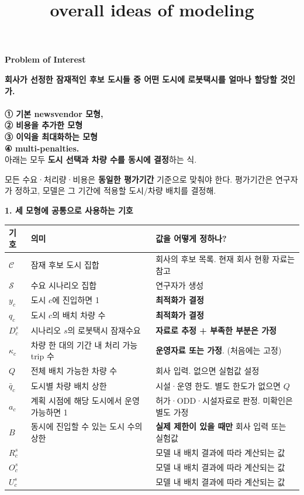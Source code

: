 \documentclass[11pt,a4paper]{article}
\title{overall ideas of modeling}
\newcommand{\blocktitle}[1]{\par\bigskip\noindent\textbf{\large #1}\par\smallskip}
\begin{document}
\blocktitle{Problem of Interest}
\textbf{회사가 선정한 잠재적인 후보 도시들 중 어떤 도시에 로봇택시를 얼마나 할당할 것인가.} \\
\\
\textbf{① 기본 newsvendor 모형, \\
② 비용을 추가한 모형 \\
③ 이익을 최대화하는 모형 \\
④ multi-penalties.} \\
아래는 모두 \textbf{도시 선택과 차량 수를 동시에 결정}하는 식.

모든 수요·처리량·비용은 \textbf{동일한 평가기간} 기준으로 맞춰야 한다. 평가기간은 연구자가 정하고, 모델은 그 기간에 적용할 도시/차량 배치를 결정해.

\blocktitle{1. 세 모형에 공통으로 사용하는 기호}

\begin{longtable}{@{}P{0.12\textwidth}P{0.34\textwidth}P{0.46\textwidth}@{}}
\toprule
기호 & 의미 & 값을 어떻게 정하나? \\
\midrule
\endhead
$\mathcal C$ & 잠재 후보 도시 집합 & 회사의 후보 목록. 현재 회사 현황 자료는 참고 \\
$\mathcal S$ & 수요 시나리오 집합 & 연구자가 생성 \\
$y_c$ & 도시 $c$에 진입하면 1 & \textbf{최적화가 결정} \\
$q_c$ & 도시 $c$의 배치 차량 수 & \textbf{최적화가 결정} \\
$D_c^s$ & 시나리오 $s$의 로봇택시 잠재수요 & \textbf{자료로 추정 + 부족한 부분은 가정} \\
$\kappa_c$ & 차량 한 대의 기간 내 처리 가능 trip 수 & \textbf{운영자료 또는 가정}. (처음에는 고정) \\
$Q$ & 전체 배치 가능한 차량 수 & 회사 입력. 없으면 실험값 설정 \\
$\bar q_c$ & 도시별 차량 배치 상한 & 시설·운영 한도. 별도 한도가 없으면 $Q$ \\
$a_c$ & 계획 시점에 해당 도시에서 운영 가능하면 1 & 허가·ODD·시설자료로 판정. 미확인은 별도 가정 \\
$B$ & 동시에 진입할 수 있는 도시 수의 상한 & \textbf{실제 제한이 있을 때만} 회사 입력 또는 실험값 \\
$R_c^s$ &  & 모델 내 배치 결과에 따라 계산되는 값\\
$O_c^s$ &  & 모델 내 배치 결과에 따라 계산되는 값\\
$U_c^s$ &  & 모델 내 배치 결과에 따라 계산되는 값\\



\bottomrule
\end{longtable}
\end{document}
